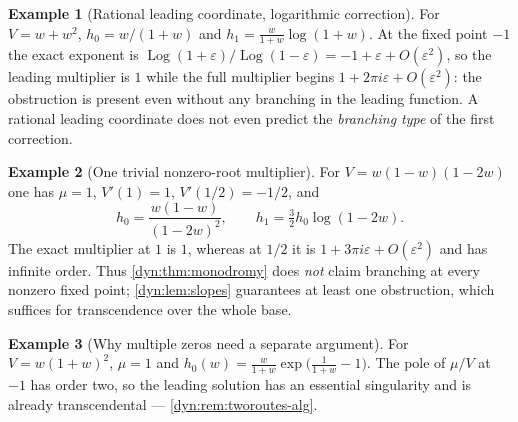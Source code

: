 \documentclass[11pt,letterpaper]{article}
\theoremstyle{definition}
\newtheorem{example}[example]{Example}
\theoremstyle{remark}
\newcommand{\Log}{\operatorname{Log}}
\newcommand{\eps}{\varepsilon}
\numberwithin{equation}{section}
\begin{document}
\begin{example}[Rational leading coordinate, logarithmic correction]
\label{dyn:ex:rational}
For $V=w+w^{2}$, $h_0=w/(1+w)$ and $h_1=\frac{w}{1+w}\log(1+w)$. At the
fixed point $-1$ the exact exponent is
$\Log(1+\eps)/\Log(1-\eps)=-1+\eps+O(\eps^{2})$, so the leading multiplier
is $1$ while the full multiplier begins $1+2\pi i\eps+O(\eps^{2})$: the
obstruction is present even without any branching in the leading function.
A rational leading coordinate does not even predict the \emph{branching
type} of the first correction.
\end{example}

\begin{example}[One trivial nonzero-root multiplier]\label{dyn:ex:trivialroot}
For $V=w(1-w)(1-2w)$ one has $\mu=1$, $V'(1)=1$, $V'(1/2)=-1/2$, and
\[
 h_0=\frac{w(1-w)}{(1-2w)^{2}},\qquad h_1=\tfrac32h_0\log(1-2w).
\]
The exact multiplier at $1$ is $1$, whereas at $1/2$ it is
$1+3\pi i\eps+O(\eps^{2})$ and has infinite order. Thus
\cref{dyn:thm:monodromy} does \emph{not} claim branching at every nonzero
fixed point; \cref{dyn:lem:slopes} guarantees at least one obstruction,
which suffices for transcendence over the whole base.
\end{example}

\begin{example}[Why multiple zeros need a separate argument]
\label{dyn:ex:multiplezero}
For $V=w(1+w)^{2}$, $\mu=1$ and
$h_0(w)=\frac{w}{1+w}\exp\bigl(\frac1{1+w}-1\bigr)$. The pole of $\mu/V$ at
$-1$ has order two, so the leading solution has an essential singularity
and is already transcendental --- \cref{dyn:rem:tworoutes-alg}.
\end{example}
\end{document}
